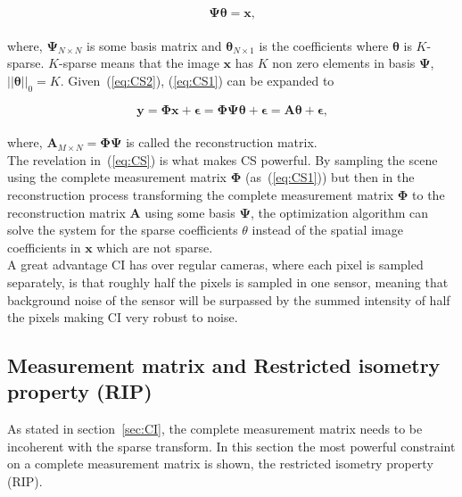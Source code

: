 \begin{equation}
\label{eq:CS2}
   \mathbf{ \Psi \theta = x }\text{,}
\end{equation}\\[0.1in]

where, $\mathbf{\Psi}_{N \times N}$ is some basis matrix and
$\mathbf{\theta}_{N\times1}$ is the coefficients where $\mathbf{\theta}$ is $K$-sparse. $K$-sparse means that the image $\mathbf{x}$ has $K$ non zero elements in basis $\mathbf{\Psi}$, $||\mathbf{\theta}||_0 = K$. Given~(\ref{eq:CS2}), (\ref{eq:CS1}) can be expanded to


\begin{equation}
   \mathbf{ y = \Phi x + \epsilon = \Phi \Psi \theta + \epsilon = A \theta + \epsilon }\text{,}
   \label{eq:CS}
\end{equation}\\[0.1in]

where, $\textbf{A}_{M \times N} = \mathbf{\Phi \Psi}$ is called the reconstruction matrix.\\[0.1in] 

The revelation in~(\ref{eq:CS}) is what makes CS powerful. By sampling the scene using the complete measurement matrix $\mathbf{\Phi}$ (as~(\ref{eq:CS1})) but then in the reconstruction process transforming the complete measurement matrix $\mathbf{\Phi}$ to the reconstruction matrix $\mathbf{A}$ using some basis $\mathbf{\Psi}$, the optimization algorithm can solve the system for the sparse coefficients $\theta$ instead of the spatial image coefficients in $\mathbf{x}$ which are not sparse.\cite{book:sm}\\[0.1in]

A great advantage CI has over regular cameras, where each pixel is sampled separately, is that roughly half the pixels is sampled in one sensor, meaning that background noise of the sensor will be surpassed by the summed intensity of half the pixels making CI very robust to noise.  


\subsection{Measurement matrix and Restricted isometry property (RIP)}
\label{sec:mm_RIP}
As stated in section~\ref{sec:CI}, the complete measurement matrix needs to be incoherent with the sparse transform. In this section the most powerful constraint on a complete measurement matrix is shown, the restricted isometry property (RIP). \\[0.1in]


